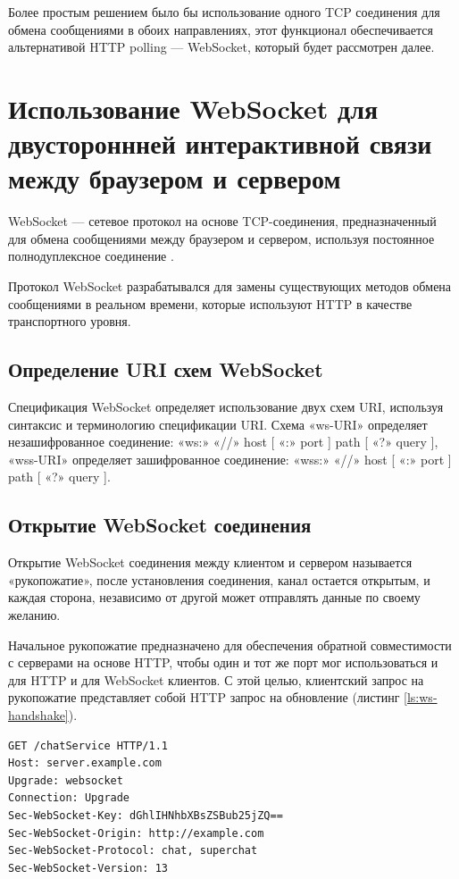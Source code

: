 Более простым решением было бы использование одного TCP соединения для обмена сообщениями в обоих направлениях, этот функционал обеспечивается альтернативой HTTP polling — WebSocket, который будет рассмотрен далее.

\section{Использование WebSocket для двустороннней интерактивной связи между браузером и сервером}

WebSocket — сетевое протокол на основе TCP-соединения, предназначенный для обмена сообщениями между браузером и сервером, используя постоянное полнодуплексное соединение \cite{RealTimeWebAppWsNodejs}.

Протокол WebSocket разрабатывался для замены существующих методов обмена сообщениями в реальном времени, которые используют HTTP в качестве транспортного уровня.

\subsection{Определение URI схем WebSocket}

Спецификация WebSocket определяет использование двух схем URI, используя синтаксис и терминологию спецификации URI. Схема «ws-URI» определяет незашифрованное соединение: «ws:» «//» host [ «:» port ] path [ «?» query ], «wss-URI» определяет зашифрованное соединение: «wss:» «//» host [ «:» port ] path [ «?» query ].

\subsection{Открытие WebSocket соединения}

Открытие WebSocket соединения между клиентом и сервером называется «рукопожатие», после установления соединения, канал остается открытым, и каждая сторона, независимо от другой может отправлять данные по своему желанию.

Начальное рукопожатие предназначено для обеспечения обратной совместимости с серверами на основе HTTP, чтобы один и тот же порт мог использоваться и для HTTP и для WebSocket клиентов. С этой целью, клиентский запрос на рукопожатие представляет собой HTTP запрос на обновление (листинг \ref{ls:ws-handshake}).

\begin{lstlisting}[caption={HTTP запрос на открытие WebSocket соединение}, label={ls:ws-handshake}]
GET /chatService HTTP/1.1
Host: server.example.com
Upgrade: websocket
Connection: Upgrade
Sec-WebSocket-Key: dGhlIHNhbXBsZSBub25jZQ==
Sec-WebSocket-Origin: http://example.com
Sec-WebSocket-Protocol: chat, superchat
Sec-WebSocket-Version: 13
\end{lstlisting}

